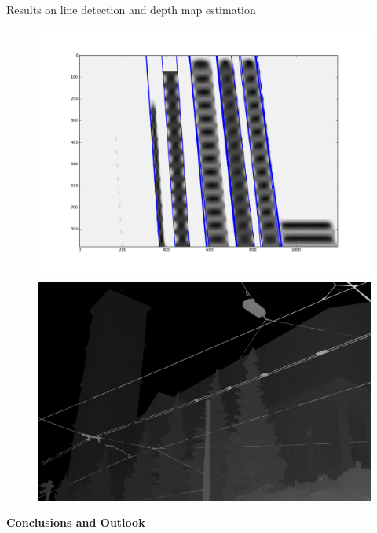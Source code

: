 \begin{frame}{Results on line detection and depth map estimation}
\begin{figure}[!tbp]
  \centering
  \begin{minipage}[b]{0.40\textwidth}
    \includegraphics[width=\textwidth]{../../Diagrams/results/Disparity_benchmark/673_10_102_7_48_8_lines.png}
  \end{minipage}
	\pause
  \begin{minipage}[b]{0.40\textwidth}
    \includegraphics[width=\textwidth]{../../Diagrams/church_depth_0034.png}
  \end{minipage}
\end{figure}
\end{frame}

\begin{frame}
\begin{center}
\textbf{\huge{Conclusions and Outlook}}
\end{center}
\end{frame}

